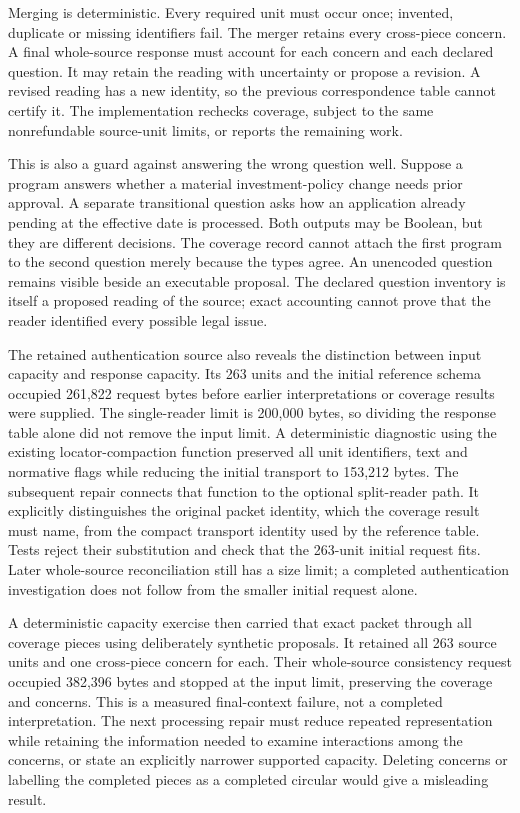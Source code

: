 Merging is deterministic. Every required unit must occur once; invented,
duplicate or missing identifiers fail. The merger retains every cross-piece
concern. A final whole-source response must account for each concern and each
declared question. It may retain the reading with uncertainty or propose a
revision. A revised reading has a new identity, so the previous correspondence
table cannot certify it. The implementation rechecks coverage, subject to the
same nonrefundable source-unit limits, or reports the remaining work.

This is also a guard against answering the wrong question well. Suppose a
program answers whether a material investment-policy change needs prior
approval. A separate transitional question asks how an application already
pending at the effective date is processed. Both outputs may be Boolean, but
they are different decisions. The coverage record cannot attach the first
program to the second question merely because the types agree. An unencoded
question remains visible beside an executable proposal. The declared question
inventory is itself a proposed reading of the source; exact accounting cannot
prove that the reader identified every possible legal issue.

The retained authentication source also reveals the distinction between input
capacity and response capacity. Its 263 units and the initial reference schema
occupied 261,822 request bytes before earlier interpretations or coverage
results were supplied. The single-reader limit is 200,000 bytes, so dividing
the response table alone did not remove the input limit. A deterministic
diagnostic using the existing locator-compaction function preserved all unit
identifiers, text and normative flags while reducing the initial transport to
153,212 bytes. The subsequent repair connects that function to the optional
split-reader path. It explicitly distinguishes the original packet identity,
which the coverage result must name, from the compact transport identity used
by the reference table. Tests reject their substitution and check that the
263-unit initial request fits. Later whole-source reconciliation still has a
size limit; a completed authentication investigation does not follow from the
smaller initial request alone.

A deterministic capacity exercise then carried that exact packet through all
coverage pieces using deliberately synthetic proposals. It retained all 263
source units and one cross-piece concern for each. Their whole-source
consistency request occupied 382,396 bytes and stopped at the input limit,
preserving the coverage and concerns. This is a measured final-context failure,
not a completed interpretation. The next processing repair must reduce repeated
representation while retaining the information needed to examine interactions
among the concerns, or state an explicitly narrower supported capacity. Deleting
concerns or labelling the completed pieces as a completed circular would give
a misleading result.


